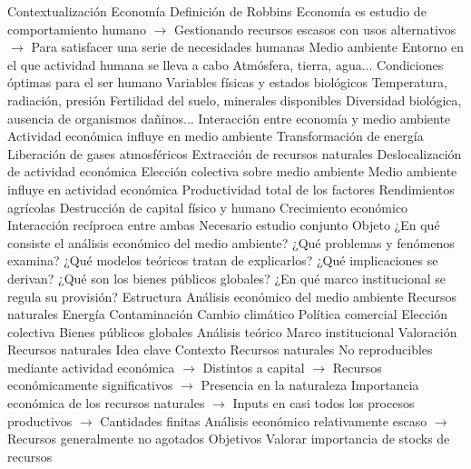 \documentclass{nuevotema}
\begin{document}
\esquemalargo

\begin{esquemal}
	\1[] 
		\2 Contextualización
			\3 Economía
				\4 Definición de Robbins
				\4[] Economía es estudio de comportamiento humano
				\4[] $\to$ Gestionando recursos escasos con usos alternativos
				\4[] $\to$ Para satisfacer una serie de necesidades humanas
			\3 Medio ambiente
				\4 Entorno en el que actividad humana se lleva a cabo
				\4[] Atmósfera, tierra, agua...
				\4 Condiciones óptimas para el ser humano
				\4[] Variables físicas y estados biológicos
				\4[] Temperatura, radiación, presión
				\4[] Fertilidad del suelo, minerales disponibles
				\4[] Diversidad biológica, ausencia de organismos dañinos...
			\3 Interacción entre economía y medio ambiente
				\4 Actividad económica influye en medio ambiente
				\4[] Transformación de energía
				\4[] Liberación de gases atmosféricos
				\4[] Extracción de recursos naturales
				\4[] Deslocalización de actividad económica
				\4[] Elección colectiva sobre medio ambiente
				\4 Medio ambiente influye en actividad económica
				\4[] Productividad total de los factores
				\4[] Rendimientos agrícolas
				\4[] Destrucción de capital físico y humano
				\4[] Crecimiento económico
				\4 Interacción recíproca entre ambas
				\4[$\then$] Necesario estudio conjunto
		\2 Objeto
			\3 ¿En qué consiste el análisis económico del medio ambiente?
			\3 ¿Qué problemas y fenómenos examina?
			\3 ¿Qué modelos teóricos tratan de explicarlos?
			\3 ¿Qué implicaciones se derivan?
			\3 ¿Qué son los bienes públicos globales?
			\3 ¿En qué marco institucional se regula su provisión?
		\2 Estructura
			\3 Análisis económico del medio ambiente
				\4 Recursos naturales
				\4 Energía
				\4 Contaminación
				\4 Cambio climático
				\4 Política comercial
				\4 Elección colectiva
			\3 Bienes públicos globales
				\4 Análisis teórico
				\4 Marco institucional
				\4 Valoración
	\1 
		\2 Recursos naturales
			\3 Idea clave
				\4 Contexto
				\4[] Recursos naturales
				\4[] No reproducibles mediante actividad económica
				\4[] $\to$ Distintos a capital
				\4[] $\to$ Recursos económicamente significativos
				\4[] $\to$ Presencia en la naturaleza
				\4[] Importancia económica de los recursos naturales
				\4[] $\to$ Inputs en casi todos los procesos productivos
				\4[] $\to$ Cantidades finitas
				\4[] Análisis económico relativamente escaso
				\4[] $\to$ Recursos generalmente no agotados
				\4 Objetivos
				\4[] Valorar importancia de stocks de recursos

\end{esquemal}
\end{document}
